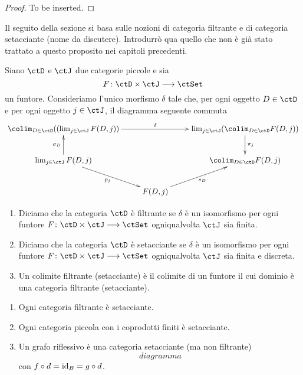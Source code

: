 \begin{proof}
	To be inserted.
\end{proof}

\begin{warning}\label{caveat_filtr_sift}
	Il seguito della sezione si basa sulle nozioni di categoria filtrante e di categoria setacciante (nome da discutere). Introdurrò qua
	quello che non è già stato trattato a questo proposito nei capitoli precedenti.
\end{warning}

\begin{definition}\label{def_filtr_sift}
	Siano \(\ctD\) e \(\ctJ\) due categorie piccole e sia
	\[
		F \colon \ctD \times \ctJ \fun \ctSet
	\]
	un funtore. Consideriamo l'unico morfismo \(\delta\) tale che, per ogni oggetto \(D \in \ctD\) e per ogni oggetto \(j \in \ctJ\), il diagramma seguente commuta
	\[\xymatrix{\colim_{D \in \ctD}((\lim_{j \in \ctJ}F(D,j)) \ar[rr]^-{\delta} & & \lim_{j \in \ctJ}(\colim_{D \in \ctD}F(D,j)) \ar[d]^{\pi_j} \\
		\lim_{j \in \ctJ}F(D,j) \ar[u]^{\sigma_D} \ar[rd]_{p_j} & & \colim_{D \in \ctD}F(D,j) \\
		& F(D,j) \ar[ru]_{s_D} }
	\]
	\begin{enumerate}
		\item Diciamo che la categoria \(\ctD\) è filtrante se \(\delta\) è un isomorfismo per ogni funtore \(F \colon \ctD \times \ctJ \fun \ctSet\)
		      ogniqualvolta \(\ctJ\) sia finita.
		\item Diciamo che la categoria \(\ctD\) è setacciante se \(\delta\) è un isomorfismo per ogni funtore \(F \colon \ctD \times \ctJ \fun \ctSet\)
		      ogniqualvolta \(\ctJ\) sia finita e discreta.
		\item Un colimite filtrante (setacciante) è il colimite di un funtore il cui dominio è una categoria filtrante (setacciante).
	\end{enumerate}
\end{definition}

\begin{examples}\label{esempi_cat_fltr_set}
	\hfill
	\begin{enumerate}
		\item Ogni categoria filtrante è setacciante.
		\item Ogni categoria piccola con i coprodotti finiti è setacciante.
		\item Un grafo riflessivo è una categoria setacciante (ma non filtrante)
		      \[
			      diagramma
		      \]
		      con \(f \circ d = \mathrm{id}_B = g \circ d\).
	\end{enumerate}
\end{examples}

